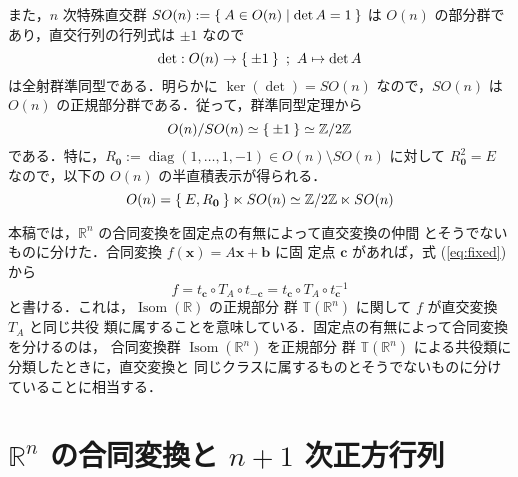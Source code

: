 \documentclass[11pt, uplatex, dvipdfmx, titlepage]{jsarticle}
\DeclareMathOperator{\Isom}{Isom}
\DeclareMathOperator{\diag}{diag}
\theoremstyle{definition}
\begin{document}
また，$n$ 次特殊直交群 $SO(n):=\Set{A \in O(n) | \det
  A=1}$ は $O(n)$ の部分群であり，直交行列の行列式は $\pm 1$ なので
\[
  \det : O(n) \to \Set{\pm 1} \ ; \ A \mapsto \det A
\]
は全射群準同型である．明らかに $\ker (\det) = SO(n)$ なので，$SO(n)$
は $O(n)$ の正規部分群である．従って，群準同型定理から
\[
  O(n)/SO(n) \simeq \Set{\pm 1} \simeq \mathbb{Z}/2\mathbb{Z}
\]
である．特に，$R_{\bm{0}}:=\diag(1,\ldots, 1, -1) \in O(n) \setminus
SO(n)$ に対して $R_{\bm{0}}^2 =E$ なので，以下の $O(n)$ の半直積表示が得られる．
\[
  O(n) = \Set{E, R_{\bm{0}}} \ltimes SO(n) \simeq  \mathbb{Z}/2\mathbb{Z} \ltimes SO(n)
\]

本稿では，$\mathbb{R}^n$ の合同変換を固定点の有無によって直交変換の仲間
とそうでないものに分けた．合同変換 $f(\bm{x}) = A\bm{x} + \bm{b}$ に固
定点 $\bm{c}$ があれば，式 (\ref{eq:fixed})から
\[
  f = t_{\bm{c}} \circ T_A \circ t_{-\bm{c}} = t_{\bm{c}} \circ T_A \circ t_{\bm{c}}^{-1}
\]
と書ける．これは，$\Isom(\mathbb{R})$ の正規部分
群 $\mathbb{T}(\mathbb{R}^n)$ に関して $f$ が直交変換 $T_A$ と同じ共役
類に属することを意味している．固定点の有無によって合同変換を分けるのは，
合同変換群 $\Isom(\mathbb{R}^n)$ を正規部分
群 $\mathbb{T}(\mathbb{R}^n)$ による共役類に分類したときに，直交変換と
同じクラスに属するものとそうでないものに分けていることに相当する．

\section{$\mathbb{R}^n$ の合同変換と $n+1$ 次正方行列}\label{sec:matrix}
\end{document}
